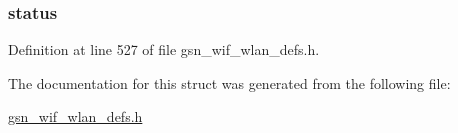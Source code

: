 \hypertarget{a00317_ac4f6d5d1544a8d2c1309479ffe1b61ab}{
\subsubsection[{status}]{ {\bf status}}}
\label{a00317_ac4f6d5d1544a8d2c1309479ffe1b61ab}


Definition at line 527 of file gsn\_\-wif\_\-wlan\_\-defs.h.



The documentation for this struct was generated from the following file:\begin{DoxyCompactItemize}
\item 
\hyperlink{a00613}{gsn\_\-wif\_\-wlan\_\-defs.h}\end{DoxyCompactItemize}

